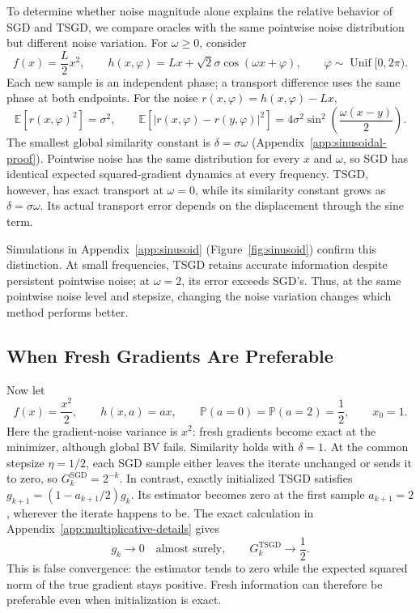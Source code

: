 To determine whether noise magnitude alone explains the relative behavior
of SGD and TSGD, we compare oracles with the same pointwise noise
distribution but different noise variation. For $\omega\geq0$, consider
\begin{equation}
\label{eq:fixed-variance-oracle}
f(x)=\frac L2x^2,\qquad
h(x,\varphi)=Lx+\sqrt2\sigma\cos(\omega x+\varphi),
\qquad \varphi\sim\operatorname{Unif}[0,2\pi).
\end{equation}
Each new sample is an independent phase; a transport difference
uses the same phase at both endpoints. For the noise
$r(x,\varphi)=h(x,\varphi)-Lx$,
\begin{equation}
\label{eq:phase-noise-moments}
\mathbb E[r(x,\varphi)^2]=\sigma^2,\qquad
\mathbb E[|r(x,\varphi)-r(y,\varphi)|^2]
=4\sigma^2\sin^2\!\left(\frac{\omega(x-y)}2\right).
\end{equation}
The smallest global similarity constant is $\delta=\sigma\omega$
(Appendix~\ref{app:sinusoidal-proof}). Pointwise noise has the same
distribution for every $x$ and $\omega$, so SGD has identical
expected squared-gradient dynamics at every frequency. TSGD,
however, has exact transport at $\omega=0$, while its similarity
constant grows as $\delta=\sigma\omega$. Its actual
transport error depends on the displacement through the sine term.

Simulations in Appendix~\ref{app:sinusoid} (Figure~\ref{fig:sinusoid})
confirm this distinction. At small frequencies, TSGD retains accurate
information despite persistent pointwise noise; at $\omega=2$, its error
exceeds SGD's. Thus, at the same pointwise noise level and stepsize,
changing the noise variation changes which method performs better.

\subsection{When Fresh Gradients Are Preferable}
\label{subsec:multiplicative-noise-comparison}

Now let
\begin{equation}
\label{eq:multiplicative-comparison-oracle}
f(x)=\frac{x^2}{2},\qquad h(x,a)=ax,\qquad
\mathbb P(a=0)=\mathbb P(a=2)=\frac12,\qquad x_0=1.
\end{equation}
Here the gradient-noise variance is $x^2$: fresh gradients become
exact at the minimizer, although global BV fails. Similarity holds
with $\delta=1$. At the common stepsize $\eta=1/2$, each SGD sample
either leaves the iterate unchanged or sends it to zero, so
$G_k^{\mathrm{SGD}}=2^{-k}$. In contrast, exactly initialized TSGD
satisfies $g_{k+1}=(1-a_{k+1}/2)g_k$. Its estimator becomes zero at
the first sample $a_{k+1}=2$, wherever the iterate happens to be.
The exact calculation in Appendix~\ref{app:multiplicative-details}
gives
\[
g_k\longrightarrow0\quad\text{almost surely},\qquad
G_k^{\mathrm{TSGD}}\longrightarrow\frac12.
\]
This is false convergence: the estimator tends to zero while the
expected squared norm of the true gradient stays positive.
Fresh information can therefore be
preferable even when initialization is exact.

